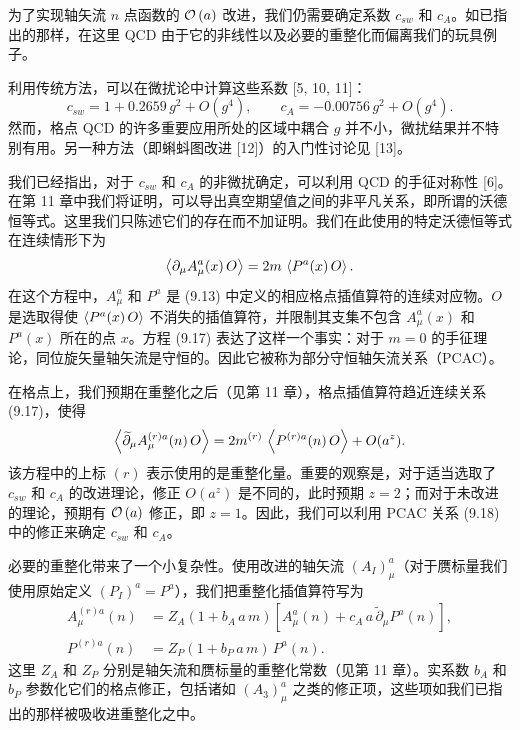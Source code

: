 为了实现轴矢流 $n$ 点函数的 $\mathcal{O}\left(a\right)$ 改进，我们仍需要确定系数 $c_{sw}$ 和 $c_A$。如已指出的那样，在这里 QCD 由于它的非线性以及必要的重整化而偏离我们的玩具例子。

利用传统方法，可以在微扰论中计算这些系数 [5, 10, 11]：
\begin{equation}
  c_{sw} = 1 + 0.2659\,g^2 + O(g^4) , \qquad c_A = -0.00756\,g^2 + O(g^4) .
\end{equation}
然而，格点 QCD 的许多重要应用所处的区域中耦合 $g$ 并不小，微扰结果并不特别有用。另一种方法（即蝌蚪图改进 [12]）的入门性讨论见 [13]。

我们已经指出，对于 $c_{sw}$ 和 $c_A$ 的非微扰确定，可以利用 QCD 的手征对称性 [6]。在第 11 章中我们将证明，可以导出真空期望值之间的非平凡关系，即所谓的沃德恒等式。这里我们只陈述它们的存在而不加证明。我们在此使用的特定沃德恒等式在连续情形下为
\begin{equation}
  \left\langle \partial_\mu A^a_\mu(x)\,O \right\rangle = 2m\,\left\langle P^a(x)\,O \right\rangle .
\end{equation}
在这个方程中，$A^a_\mu$ 和 $P^a$ 是 (9.13) 中定义的相应格点插值算符的连续对应物。$O$ 是选取得使 $\left\langle P^a(x)\,O \right\rangle$ 不消失的插值算符，并限制其支集不包含 $A^a_\mu(x)$ 和 $P^a(x)$ 所在的点 $x$。方程 (9.17) 表达了这样一个事实：对于 $m = 0$ 的手征理论，同位旋矢量轴矢流是守恒的。因此它被称为部分守恒轴矢流关系（PCAC）。

在格点上，我们预期在重整化之后（见第 11 章），格点插值算符趋近连续关系 (9.17)，使得
\begin{equation}
  \left\langle \widetilde{\partial}_\mu A^{(r)a}_\mu(n)\,O \right\rangle
  = 2m^{(r)}\,\left\langle P^{(r)a}(n)\,O \right\rangle + O(a^z) .
\end{equation}
该方程中的上标 $(r)$ 表示使用的是重整化量。重要的观察是，对于适当选取了 $c_{sw}$ 和 $c_A$ 的改进理论，修正 $O(a^z)$ 是不同的，此时预期 $z = 2$；而对于未改进的理论，预期有 $\mathcal{O}\left(a\right)$ 修正，即 $z = 1$。因此，我们可以利用 PCAC 关系 (9.18) 中的修正来确定 $c_{sw}$ 和 $c_A$。

必要的重整化带来了一个小复杂性。使用改进的轴矢流 $(A_I)^a_\mu$（对于赝标量我们使用原始定义 $(P_I)^a = P^a$），我们把重整化插值算符写为
\begin{align}
  A^{(r)a}_\mu(n) &= Z_A(1 + b_A\,a\,m)\left[A^a_\mu(n) + c_A\,a\,\widetilde{\partial}_\mu P^a(n)\right] , \nonumber\\
  P^{(r)a}(n) &= Z_P(1 + b_P\,a\,m)\,P^a(n) .
\end{align}
这里 $Z_A$ 和 $Z_P$ 分别是轴矢流和赝标量的重整化常数（见第 11 章）。实系数 $b_A$ 和 $b_P$ 参数化它们的格点修正，包括诸如 $(A_3)^a_\mu$ 之类的修正项，这些项如我们已指出的那样被吸收进重整化之中。


